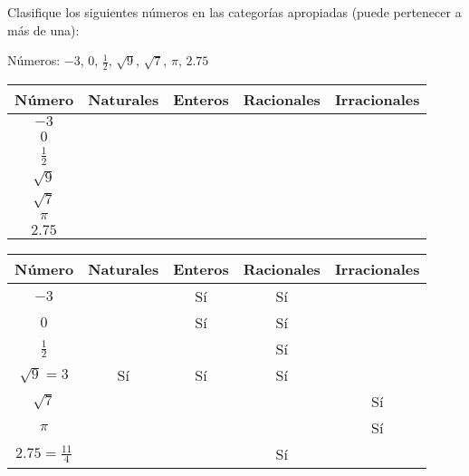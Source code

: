 \begin{exercise}
\problem Clasifique los siguientes números en las categorías apropiadas (puede pertenecer a más de una):

Números: $-3$, $0$, $\frac{1}{2}$, $\sqrt{9}$, $\sqrt{7}$, $\pi$, $2.75$

\begin{center}
\begin{tabular}{|c|c|c|c|c|}
\hline
\textbf{Número} & \textbf{Naturales} & \textbf{Enteros} & \textbf{Racionales} & \textbf{Irracionales} \\
\hline
$-3$ & & & & \\
\hline
$0$ & & & & \\
\hline
$\frac{1}{2}$ & & & & \\
\hline
$\sqrt{9}$ & & & & \\
\hline
$\sqrt{7}$ & & & & \\
\hline
$\pi$ & & & & \\
\hline
$2.75$ & & & & \\
\hline
\end{tabular}
\end{center}

\begin{solucion}
\begin{center}
\begin{tabular}{|c|c|c|c|c|}
\hline
\textbf{Número} & \textbf{Naturales} & \textbf{Enteros} & \textbf{Racionales} & \textbf{Irracionales} \\
\hline
$-3$ & & Sí & Sí & \\
\hline
$0$ & & Sí & Sí & \\
\hline
$\frac{1}{2}$ & & & Sí & \\
\hline
$\sqrt{9} = 3$ & Sí & Sí & Sí & \\
\hline
$\sqrt{7}$ & & & & Sí \\
\hline
$\pi$ & & & & Sí \\
\hline
$2.75 = \frac{11}{4}$ & & & Sí & \\
\hline
\end{tabular}
\end{center}
\end{solucion}
\end{exercise}

